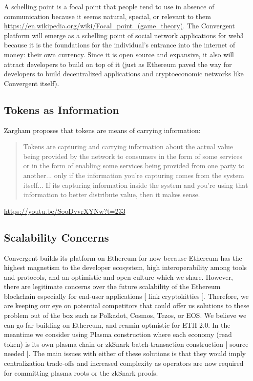 \documentclass[a4paper, 10pt]{article}
\begin{document}
A schelling point is a focal point that people tend to use in absence of communication because it seems natural, special, or relevant to them \url{https://en.wikipedia.org/wiki/Focal_point_(game_theory)}. The Convergent platform will emerge as a schelling point of social network applications for web3 because it is the foundations for the individual’s entrance into the internet of money: their own currency. Since it is open source and expansive, it also will attract developers to build on top of it (just as Ethereum paved the way for developers to build decentralized applications and cryptoeconomic networks like Convergent itself).

\subsection{Tokens as Information}

Zargham proposes that tokens are means of carrying information:
\begin{quotation}
Tokens are capturing and carrying information about the actual value being provided by the network to consumers in the form of some services or in the form of enabling some services being provided from one party to another... only if the information you're capturing comes from the system itself... If its capturing information inside the system and you're using that information to better distribute value, then it makes sense.
\end{quotation}

\url{https://youtu.be/SooDvvrXYNw?t=233}

\subsection{Scalability Concerns}

Convergent builds its platform on Ethereum for now because Ethereum has the highest magnetism to the developer ecosystem, high interoperability among tools and protocols, and an optimistic and open culture which we share. However, there are legitimate concerns over the future scalability of the Ethereum blockchain especially for end-user applications [ link cryptokitties ]. Therefore, we are keeping our eye on potential competitors that could offer us solutions to these problem out of the box such as Polkadot, Cosmos, Tezos, or EOS. We believe we can go far building on Ethereum, and reamin optmistic for ETH 2.0. In the meantime we consider using Plasma construction where each economy (read token) is its own plasma chain or zkSnark batch-transaction construction [ source needed ]. The main issues with either of these solutions is that they would imply centralization trade-offs and increased complexity as operators are now required for committing plasma roots or the zkSnark proofs. 
\end{document}
